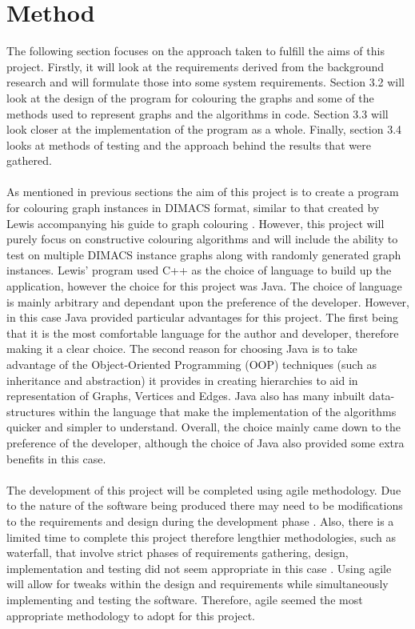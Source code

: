 \section{Method}

The following section focuses on the approach taken to fulfill the aims of this project. Firstly, it will look at the requirements derived from the background research and will formulate those into some system requirements. Section 3.2 will look at the design of the program for colouring the graphs and some of the methods used to represent graphs and the algorithms in code. 
Section 3.3 will look closer at the implementation of the program as a whole. Finally, section 3.4 looks at methods of testing and the approach behind the results that were gathered. 
\\\\
As mentioned in previous sections the aim of this project is to create a program for colouring graph instances in DIMACS format, similar to that created by Lewis accompanying his guide to graph colouring \cite{LewisR.M.R2015AGtG}. However, this project will purely focus on constructive colouring algorithms and will include the ability to test on multiple DIMACS instance graphs along with randomly generated graph instances. Lewis' program used C++ as the choice of language to build up the application, however the choice for this project was Java. The choice of language is mainly arbitrary and dependant upon the preference of the developer. However, in this case Java provided particular advantages for this project. The first being that it is the most comfortable language for the author and developer, therefore making it a clear choice. The second reason for choosing Java is to take advantage of the Object-Oriented Programming (OOP) techniques (such as inheritance and abstraction) it provides in creating hierarchies to aid in representation of Graphs, Vertices and Edges. Java also has many inbuilt data-structures within the language that make the implementation of the algorithms quicker and simpler to understand. Overall, the choice mainly came down to the preference of the developer, although the choice of Java also provided some extra benefits in this case. 
\\\\
The development of this project will be completed using agile methodology. Due to the nature of the software being produced there may need to be modifications to the requirements and design during the development phase \cite{Agile}. Also, there is a limited time to complete this project therefore lengthier methodologies, such as waterfall, that involve strict phases of requirements gathering, design, implementation and testing did not seem appropriate in this case \cite{Waterfall}. Using agile will allow for tweaks within the design and requirements while simultaneously implementing and testing the software. Therefore, agile seemed the most appropriate methodology to adopt for this project. 

